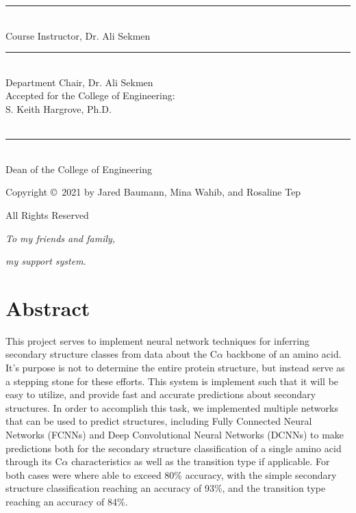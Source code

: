 \documentclass[12pt,letterpaper,oneside,reqno]{book}
\theoremstyle{plain}
\theoremstyle{definition}
\theoremstyle{plain}
\theoremstyle{remark}
\theoremstyle{plain}
\theoremstyle{definition}
\theoremstyle{plain}
\newcommand*{\threeemdash}{\rule[0.5ex]{17em}{1.5pt}}
\begin{document}
\hspace{8cm} \threeemdash \vspace{-0.4cm} \\
\indent \hspace{8cm} Course Instructor, Dr. Ali Sekmen\\
\vspace{0.3cm}

\hspace{8cm} \threeemdash \vspace{-0.4cm} \\
\indent \hspace{8cm} Department Chair, Dr. Ali Sekmen\\

\vspace{2cm}
Accepted for the College of Engineering:\\
\indent  S. Keith Hargrove, Ph.D. \vspace{0.3cm}\\ \\
\indent \threeemdash \vspace{-0.4cm} \\
\indent Dean of the College of Engineering

\newpage
\singlespacing
\thispagestyle{empty}
\vspace*{4.5in}
\centerline{Copyright {\small\copyright}\ 2021 by Jared Baumann, Mina Wahib, and Rosaline Tep}
\centerline{All Rights Reserved}

\newpage
\setcounter{page}{2}

\vspace*{3in}
\centerline{\em To my friends and family,}
\vspace{18pt}
\centerline{\em my support system.}


\newpage
\doublespacing
\chapter{Abstract}

This project serves to implement neural network techniques for inferring secondary structure classes from data about the C$\alpha$ backbone of an amino acid.
It's purpose is not to determine the entire protein structure, but instead serve as a stepping stone for these efforts. 
This system is implement such that it will be easy to utilize, and provide fast and accurate predictions about secondary structures. In order to accomplish this task, we implemented multiple networks that can be used to predict structures, including Fully Connected Neural Networks (FCNNs) and Deep Convolutional Neural Networks (DCNNs) to make predictions both for the secondary structure classification of a single amino acid through its C$\alpha$ characteristics as well as the transition type if applicable. For both cases were where able to exceed 80\% accuracy, with the simple secondary structure classification reaching an accuracy of 93\%, and the transition type reaching an accuracy of 84\%.
\newpage
\doublespacing
\end{document}
